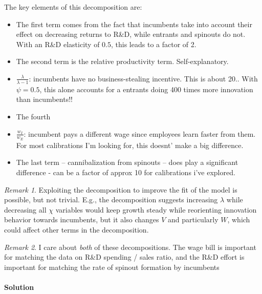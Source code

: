 \documentclass[12pt,english]{article}
\theoremstyle{remark}
\newtheorem{remark}{Remark}
\begin{document}
\begin{itemize}
	The key elements of this decomposition are:
	\begin{itemize}
		\item The first term comes from the fact that incumbents take into account their effect on decreasing returns to R\&D, while entrants and spinouts do not. With an R\&D elasticity of $0.5$, this leads to a factor of 2. 
		\item The second term is the relative productivity term. Self-explanatory. 
		\item $\frac{\lambda}{\lambda-1}$: incumbents have no business-stealing incentive. This is about 20.. With $\psi = 0.5$, this alone accounts for a entrants doing 400 times more innovation than incumbents!!
		\item The fourth 
		\item $\frac{w_I}{w_E}$: incumbent pays a different wage since employees learn faster from them. For most calibrations I'm looking for, this doesnt' make a big difference.
		\item The last term -- cannibalization from spinouts -- does play a significant difference - can be a factor of approx 10 for calibrations i've explored. 
	\end{itemize}

	\begin{remark}
		Exploiting the decomposition to improve the fit of the model is possible, but not trivial. E.g., the decomposition suggests increasing $\lambda$ while decreasing all $\chi$ variables would keep growth steady while reorienting innovation behavior towards incumbents, but it also changes $V$ and particularly $W$, which could affect other terms in the decomposition. 
	\end{remark}

	\begin{remark}
		I care about \emph{both} of these decompositions. The wage bill is important for matching the data on R\&D spending / sales ratio, and the R\&D effort is important for matching the rate of spinout formation by incumbents
	\end{remark}
\end{itemize}



\paragraph{Solution}
\end{document}
